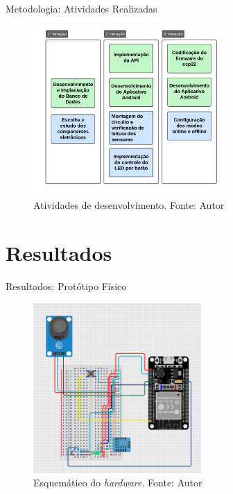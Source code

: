 \documentclass[12pt]{beamer}
\begin{document}
    \begin{frame}{Metodologia: Atividades Realizadas}
        \begin{figure}[ht]
            \centering
            \includegraphics[width=0.66\textwidth]{img/tarefas-metodologia.png}
            \caption{Atividades de desenvolvimento. Fonte: Autor}\label{fig:atv}
        \end{figure}
    \end{frame}

    \section{Resultados}

    \begin{frame}{Resultados: Protótipo Físico}
        \begin{figure}[ht]
            \centering
            \includegraphics[width=0.57\textwidth]{img/buri-esquematico.png}
            \caption{Esquemático do \textit{hardware}. Fonte: Autor}\label{fig:hardware}
        \end{figure}
    \end{frame}
\end{document}
